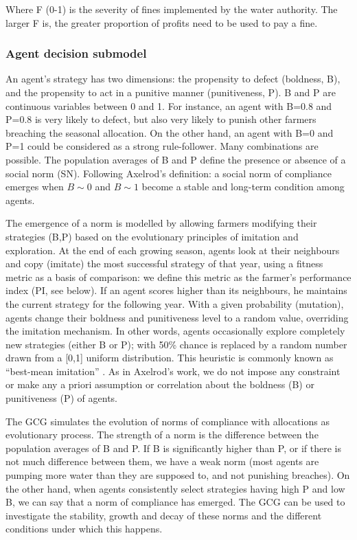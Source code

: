 \documentclass[12pt, a4paper]{article}
\begin{document}
Where F (0-1) is the severity of fines implemented by the water authority. The larger F is, the greater proportion of profits need to be used to pay a fine. 

\subsubsection{Agent decision submodel}

An agent’s strategy has two dimensions: the propensity to defect (boldness, B), and the propensity to act in a punitive manner (punitiveness, P). B and P are continuous variables between 0 and 1. For instance, an agent with B=0.8 and P=0.8 is very likely to defect, but also very likely to punish other farmers breaching the seasonal allocation. On the other hand, an agent with B=0 and P=1 could be considered as a strong rule-follower. Many combinations are possible. The population averages of B and P define the presence or absence of a social norm (SN). Following Axelrod’s definition: a social norm of compliance emerges when $B\sim0$ and $B\sim1$ become a stable and long-term condition among agents. 

The emergence of a norm is modelled by allowing farmers modifying their strategies (B,P) based on the evolutionary principles of imitation and exploration. At the end of each growing season, agents look at their neighbours and copy (imitate) the most successful strategy of that year, using a fitness metric as a basis of comparison: we define this metric as the farmer’s performance index (PI, see below). If an agent scores higher than its neighbours, he maintains the current strategy for the following year. With a given probability (mutation), agents change their boldness and punitiveness level to a random value, overriding the imitation mechanism. In other words, agents occasionally explore completely new strategies (either B or P); with 50\% chance is replaced by a random number drawn from a [0,1] uniform distribution. This heuristic is commonly known as “best-mean imitation” \autocite{Gotts:2009td}. As in Axelrod’s work, we do not impose any constraint or make any a priori assumption or correlation about the boldness (B) or punitiveness (P) of agents. 

The GCG simulates the evolution of norms of compliance with allocations as evolutionary process. The strength of a norm is the difference between the population averages of B and P. If B is significantly higher than P, or if there is not much difference between them, we have a weak norm (most agents are pumping more water than they are supposed to, and not punishing breaches). On the other hand, when agents consistently select strategies having high P and low B, we can say that a norm of compliance has emerged. The GCG can be used to investigate the stability, growth and decay of these norms and the different conditions under which this happens. 
\end{document}
